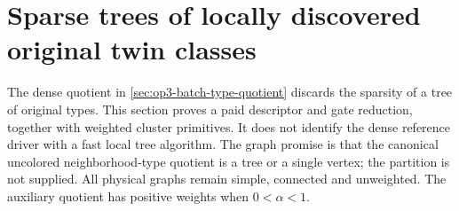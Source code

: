 \section{Sparse trees of locally discovered original twin classes}
\label{sec:op3-twin-quotient-tree}

The dense quotient in \cref{sec:op3-batch-type-quotient} discards the
sparsity of a tree of original types. This section proves a paid descriptor
and gate reduction, together with weighted cluster primitives. It does
not identify the dense reference driver with a fast local tree algorithm.
The graph promise is that the canonical uncolored neighborhood-type
quotient is a tree or a single vertex; the partition is not supplied.
All physical graphs remain simple, connected and unweighted. The auxiliary
quotient has positive weights when $0<\alpha<1$.

